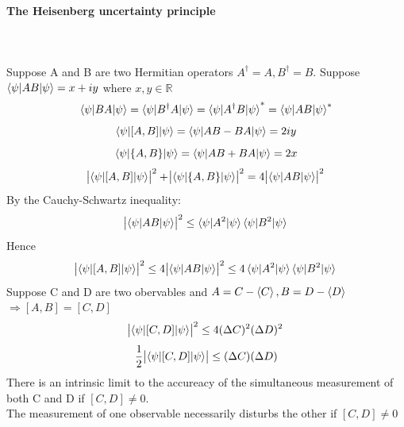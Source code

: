 \documentclass[]{article}
\theoremstyle{nonumberplain}
\begin{document}
\paragraph{The Heisenberg uncertainty principle}%
\label{par:the_heisenberg_uncertainty_principle}
\ \\
\\
Suppose A and B are two Hermitian operators $A^{\dagger}=A, B^{\dagger}=B$. Suppose $\braket{\psi|AB|\psi}=x+iy$ where $x,y \in \mathbb{R}$ 
\[
\braket{\psi|BA|\psi}=\braket{\psi|B^{\dagger}A|\psi}=\braket{\psi|A^{\dagger}B|\psi}^{*}=\braket{\psi|AB|\psi}^{*}
\] 
\[
	\braket{\psi|[A,B]|\psi}=\braket{\psi|AB-BA|\psi}=2iy
\] 
\[
	\braket{\psi|\{A,B\}|\psi}=\braket{\psi|AB+BA|\psi}=2x
\] 
\[
	\abs{\braket{\psi|[A,B]|\psi}}^{2}+\abs{\braket{\psi|\{A,B\}|\psi}}^{2}=4\abs{\braket{\psi|AB|\psi}}^{2}
\] 
By the Cauchy-Schwartz inequality:
\[
\abs{\braket{\psi|AB|\psi}}^{2} \leq \braket{\psi|A^{2}|\psi}\braket{\psi|B^{2}|\psi}
\] 
Hence
\[
	\abs{\braket{\psi|[A,B]|\psi}}^{2}\leq 4\abs{\braket{\psi|AB|\psi}}^{2}\leq 4\braket{\psi|A^{2}|\psi}\braket{\psi|B^{2}|\psi}
\] 
Suppose C and D are two obervables and $A=C-\braket{C}, B=D-\braket{D}$$\Rightarrow [A,B]=[C,D]$
\[
	\abs{\braket{\psi|[C,D]|\psi}}^{2} \leq 4(\Delta C)^{2}(\Delta D)^{2}
\] 
\[
	\frac{1}{2}\abs{\braket{\psi|[C,D]|\psi}}\leq (\Delta C)(\Delta D)
\] 
There is an intrinsic limit to the accureacy of the simultaneous measurement of both C and D if $[C,D]\neq 0.$ \\
The measurement of one observable necessarily disturbs the other if $[C,D]\neq 0$
\end{document}
